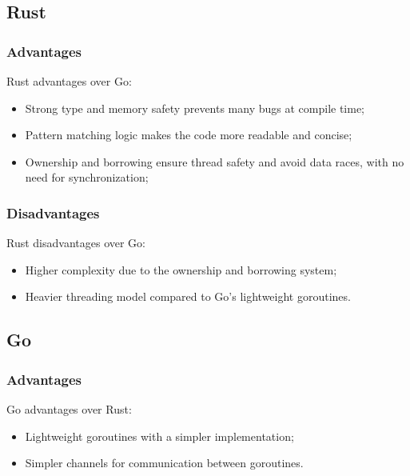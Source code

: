 \documentclass[a4paper]{article}
\begin{document}
\subsection{Rust}

\subsubsection{Advantages}

Rust advantages over Go:

\begin{itemize}
  \item Strong type and memory safety prevents many bugs at compile time;
  \item Pattern matching logic makes the code more readable and concise;
  \item Ownership and borrowing ensure thread safety and avoid data races, with no need for synchronization;
\end{itemize}


\subsubsection{Disadvantages}

Rust disadvantages over Go:

\begin{itemize}
  \item Higher complexity due to the ownership and borrowing system;
  \item Heavier threading model compared to Go's lightweight goroutines.
\end{itemize}

\clearpage

\subsection{Go}

\subsubsection{Advantages}

Go advantages over Rust:

\begin{itemize}
  \item Lightweight goroutines with a simpler implementation;
  \item Simpler channels for communication between goroutines.
\end{itemize}
\end{document}
